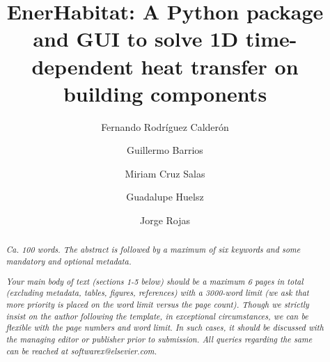 \documentclass[preprint,12pt, a4paper]{elsarticle}
\begin{document}
\begin{frontmatter}

            




\title{EnerHabitat: A Python package and GUI to solve 1D  time-dependent heat transfer on building components} %



\author{Fernando Rodríguez Calderón} %




\author{Guillermo Barrios} %
\author{Miriam Cruz Salas} %

\author{Guadalupe Huelsz} %
\author{Jorge Rojas} %



\begin{abstract}
\textit{Ca. 100 words. The abstract is followed by a maximum of six keywords
and some mandatory and optional metadata.}

\textit{Your main body of text (sections 1-5 below) should be a maximum 6 pages in total (excluding metadata, tables, figures, references) with a 3000-word limit (we ask that more priority is placed on the word limit versus the page count). Though we strictly insist on the author following the template, in exceptional circumstances, we can be flexible with the page numbers and word limit. In such cases, it should be discussed with the managing editor or publisher prior to submission. All queries regarding the same can be reached at softwarex@elsevier.com.}
\end{abstract}


\end{frontmatter}
\end{document}
